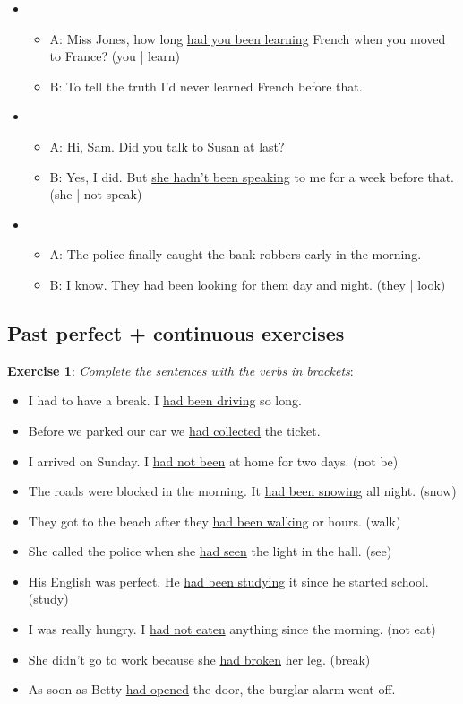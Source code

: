 \begin{itemize}
\item
\begin{itemize}
\item A: Miss Jones, how long \underline{had you been learning} French when you moved to France? (you | learn)
\item B: To tell the truth I'd never learned French before that.
\end{itemize}

\item
\begin{itemize}
\item A: Hi, Sam. Did you talk to Susan at last?
\item B: Yes, I did. But \underline{she hadn't been speaking} to me for a week before that. (she | not speak)
\end{itemize}

\item
\begin{itemize}
\item A: The police finally caught the bank robbers early in the morning.
\item B: I know. \underline{They had been looking} for them day and night. (they | look)
\end{itemize}

\end{itemize}

\subsection{Past perfect + continuous exercises}

\textbf{Exercise 1}: \textit{Complete the sentences with the verbs in brackets}:

\begin{itemize}

\item I had to have a break. I \underline{had been driving} so long.
\item Before we parked our car we \underline{had collected} the ticket.
\item I arrived on Sunday. I \underline{had not been} at home for two days. (not be)
\item The roads were blocked in the morning. It \underline{had been snowing} all night. (snow)
\item They got to the beach after they \underline{had been walking} or hours. (walk)
\item She called the police when she \underline{had seen} the light in the hall. (see)
\item His English was perfect. He \underline{had been studying} it since he started school. (study)
\item I was really hungry. I \underline{had not eaten} anything since the morning. (not eat)
\item She didn't go to work because she \underline{had broken} her leg. (break)
\item As soon as Betty \underline{had opened} the door, the burglar alarm went off.

\end{itemize}

